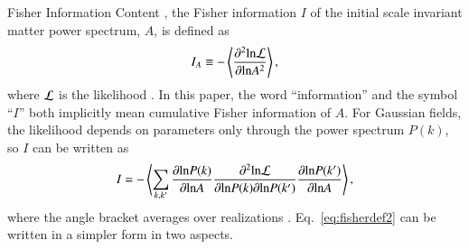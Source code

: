 \begin{section}{Fisher Information Content}
  \label{sec:fisherinfo}
  , the Fisher information $I$ of the initial scale
  invariant matter power spectrum, $A$, is defined as
  \begin{align}
    I_A \equiv -\left\langle \frac{\partial ^2 \mathrm{ln \mathcal{L}}}{\partial  \mathrm{ln} A ^2}\right\rangle,
    \label{eq:fisherdefine}
  \end{align}
  where $\mathcal{L}$ is the likelihood \citep{bib:Tegmark1997}.  
  In this paper, the word \enquote{information} and the symbol \enquote{$I$} both implicitly 
  mean cumulative Fisher information 
  of $A$. For Gaussian
  fields, the likelihood depends on parameters only through the
  power spectrum $P(k)$, so $I$ can be written as 
  \begin{align}
    I = - \left\langle \sum_{k,k'} \frac{\partial \mathrm{ln} P(k)}{\partial \mathrm{ln} A} 
    \frac{\partial ^2 \mathrm{ln \mathcal{L}}}{\partial \mathrm{ln} P(k) \partial \mathrm{ln} P(k')}
    \frac{\partial \mathrm{ln} P(k')}{\partial \mathrm{ln} A}\right\rangle,
    \label{eq:fisherdef2}
  \end{align}
  where the angle bracket averages over realizations
  \citep{bib:Rimes2006}.
  Eq.~\ref{eq:fisherdef2} can be written in a simpler
  form in two aspects.   
  

\end{section}
